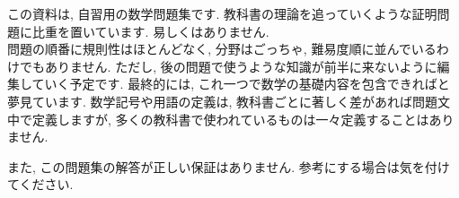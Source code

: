 \documentclass[dvipdfmx,a4j]{jarticle}
\begin{document}
この資料は, 自習用の数学問題集です. 教科書の理論を追っていくような証明問題に比重を置いています. 易しくはありません.\\
問題の順番に規則性はほとんどなく, 分野はごっちゃ, 難易度順に並んでいるわけでもありません. ただし, 後の問題で使うような知識が前半に来ないように編集していく予定です.
最終的には, これ一つで数学の基礎内容を包含できればと夢見ています.
数学記号や用語の定義は, 教科書ごとに著しく差があれば問題文中で定義しますが, 多くの教科書で使われているものは一々定義することはありません.

また, この問題集の解答が正しい保証はありません. 参考にする場合は気を付けてください.
\end{document}
